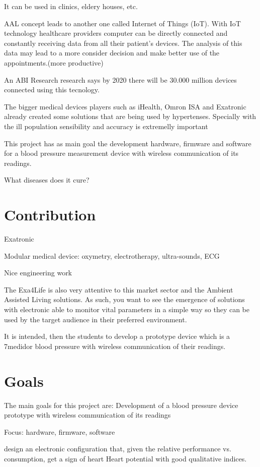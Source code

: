 It can be used in clinics, eldery houses, etc.

AAL concept leads to another one called Internet of Things (IoT). With IoT technology healthcare providers computer can be directly connected and constantly receiving data from all their patient's devices. The analysis of this data may lead to a more consider decision and make better use of the appointments.(more productive)

An ABI Research research says by 2020 there will be 30.000 million devices connected using this tecnology. ~\cite{iot}

The bigger medical devices players such as iHealth, Omron ISA and Exatronic already created some solutions that are being used by hypertenses. Specially with the ill population sensibility and accuracy is extremelly important

This project has as main goal the development hardware, firmware and software for a blood pressure measurement device with wireless communication of its readings.

What diseases does it cure?


\section{Contribution}

Exatronic

Modular medical device: oxymetry, electrotherapy, ultra-sounds, ECG

Nice engineering work

The Exa4Life is also very attentive to this market sector and the Ambient Assisted Living solutions. As such, you want to see the emergence of solutions with electronic able to monitor vital parameters in a simple way so they can be used by the target audience in their preferred environment.

It is intended, then the students to develop a prototype device which is a 7medidor blood pressure with wireless communication of their readings.

\section{Goals}

The main goals for this project are: Development of a blood pressure device prototype with wireless communication of its readings

Focus: hardware, firmware, software

design an electronic configuration that, given the relative performance vs. consumption, get a sign of heart Heart potential with good qualitative indices.

